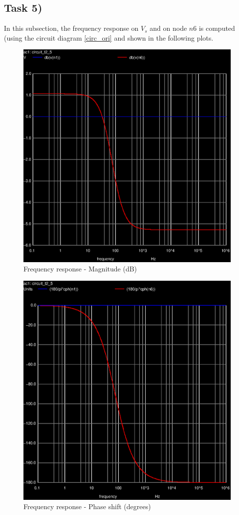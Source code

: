 \subsection{Task 5)}
\label{subsec:task5_s}

In this subsection, the frequency response on $V_s$ and on node $n6$ is computed (using the circuit diagram \ref{circ_ori} and shown in the following plots.

\begin{figure}[H]
	\centering
	\includegraphics[width=0.7\linewidth]{ac-1.eps}
	\caption{Frequency response - Magnitude (dB)}
\label{fig:Dsnh_sim_t2}
\end{figure}

\begin{figure}[H]
	\centering
	\includegraphics[width=0.7\linewidth]{ac-2.eps}
	\caption{Frequency response - Phase shift (degrees)}
\label{fig:Dsnh_sim_t2}
\end{figure}

